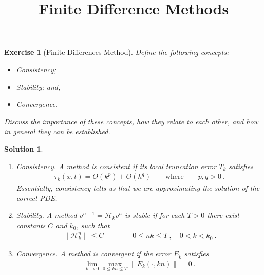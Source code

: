\documentclass[10pt,letterpaper]{article}
\newcommand{\frb}[1]{ \left(  {#1} \right) }
\theoremstyle{break}
\newtheorem{exercise}{Exercise}
\newtheorem{solution}{Solution}
\begin{document}
\title{Finite Difference Methods}
\date{}











\begin{exercise}[Finite Differences Method]
	Define the following concepts:
	\begin{itemize}
	\item[(a)] Consistency;
	\item[(b)] Stability; and,
	\item[(c)] Convergence.
	\end{itemize}
	Discuss the importance of these concepts, how they relate to each other, and how in general they can be established.
\end{exercise}

\begin{solution}
	\begin{enumerate}
		\item
		{\textit{Consistency.}}\quad 
		A method is consistent if its local truncation error $T_k$ satisfies 
		\begin{gather} 	
		\tau_k(x,t)=O\frb{k^p}+O\frb{h^q}
		\qquad
		\text{where}\qquad p,q>0\ . 
		\end{gather} 
		Essentially, consistency tells us that we are approximating the solution of the correct PDE. 
		
		\item
		{\textit{Stability.}}\quad 
		A method $v^{n+1}=\mathcal{H}_kv^n$ is stable if for each $T>0$ there exist constants $C$ and $k_0$, such that 
		\begin{gather} 	
			\|\mathcal{H}_k^n\|\le C \qquad\qquad 0\le 
		nk\le T\ , \quad 0<k<k_0\ . 
		\end{gather}
		
		\item
		{\textit{Convergence.}}\quad
		A method is convergent if the error $E_k$ satisfies 
		\begin{gather} 	
			\lim_{k\to0} \max_{0\le kn\le T}\|E_k\frb{\cdot,kn}\| = 0 \ . 
		\end{gather} 
	\end{enumerate}
\end{solution}
\end{document}
